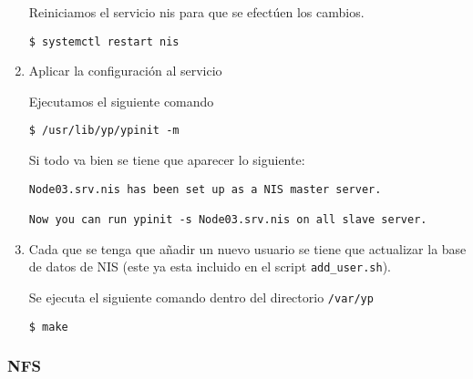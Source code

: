 \documentclass[../main.tex]{subfiles}
\begin{document}
\begin{enumerate}
        Reiniciamos el servicio nis para que se efectúen los cambios.

        \begin{listing}[H]
\begin{verbatim}
$ systemctl restart nis
\end{verbatim}
\end{listing}


  \item Aplicar la configuración al servicio

        Ejecutamos el siguiente comando

        \begin{listing}[H]
\begin{verbatim}
$ /usr/lib/yp/ypinit -m
\end{verbatim}
\end{listing}

        Si todo va bien se tiene que aparecer lo siguiente:

        \begin{listing}[H]
\begin{verbatim}
Node03.srv.nis has been set up as a NIS master server.

Now you can run ypinit -s Node03.srv.nis on all slave server.
\end{verbatim}
\end{listing}

  \item Cada que se tenga  que añadir un nuevo usuario se
        tiene que actualizar la base de datos de NIS\@
        (este ya esta incluido en el script \texttt{add\_user.sh}).

        Se ejecuta el siguiente comando dentro del directorio
        \texttt{/var/yp}

        \begin{listing}[H]
\begin{verbatim}
$ make
\end{verbatim}
\end{listing}

\end{enumerate}

\subsubsection{NFS}\label{sec:nfs}
\end{document}
